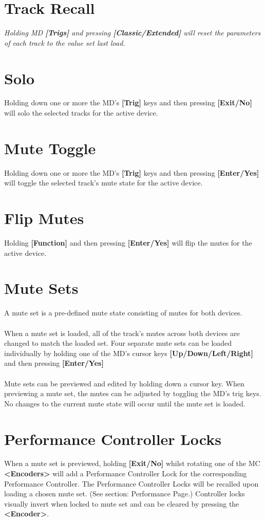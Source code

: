 \section{Track Recall}
\textit{Holding MD \textbf{[Trigs]} and pressing \textbf{[Classic/Extended]} will reset the parameters of each track to the value set last load.}
\section{Solo}
Holding down one or more the MD's \textbf{[Trig]} keys and then pressing \textbf{[Exit/No]} will solo the selected tracks for the active device.
\newpage
\section{Mute Toggle}
Holding down one or more the MD's \textbf{[Trig]} keys and then pressing \textbf{[Enter/Yes]} will toggle the selected track's mute state for the active device.
\section{Flip Mutes}
Holding \textbf{[Function]} and then pressing \textbf{[Enter/Yes]} will flip the mutes for the active device.
\section{Mute Sets}
A mute set is a pre-defined mute state consisting of mutes for both devices.\\\\  When a mute set is loaded, all of the track's mutes across both devices are changed to match the loaded set. Four separate mute sets can be loaded individually by holding one of the MD's cursor keys \textbf{[Up/Down/Left/Right]} and then pressing \textbf{[Enter/Yes]}\\\\
Mute sets can be previewed and edited by holding down a cursor key. When previewing a mute set, the mutes can be adjusted by toggling the MD's trig keys. No changes to the current mute state will occur until the mute set is loaded.
\section{Performance Controller Locks}
When a mute set is previewed, holding \textbf{[Exit/No]} whilst rotating one of the MC \textbf{<Encoders>} will add a Performance Controller Lock for the corresponding Performance Controller.  The Performance Controller Locks will be recalled upon loading a chosen mute set. (See section: Performance Page.)   Controller locks visually invert when locked to mute set and can be cleared by pressing the\textbf{ <Encoder>}.

